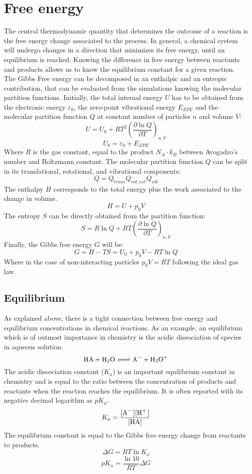 \section{Free energy}
The central thermodynamic quantity that determines the outcome of a reaction is the free energy change associated to the process. In general, a chemical system will undergo changes in a direction that minimizes its free energy, until an equilibrium is reached. Knowing the difference in free energy between reactants and products allows us to know the equilibrium constant for a given reaction. The Gibbs Free energy can be decomposed in an enthalpic and an entropic contribution, that can be evaluated from the simulations knowing the molecular partition functions. Initially, the total internal energy $U$ has to be obtained from the electronic energy $\varepsilon_0$, the zero-point vibrational energy $E_{ZPE}$ and the molecular partition function $Q$ at constant number of particles $n$ and volume $V$:
\[
U = U_{0} + R T^{2}\left(\frac{\partial \ln Q}{\partial T}\right)_{n,V}
\]
\[ U_{0} = \varepsilon_{0} + E_{ZPE} \]
Where $R$ is the gas constant, equal to the product $N_{A}\cdot k_{B}$ between Avogadro's number and Boltzmann constant. The molecular partition function $Q$ can be split in its translational, rotational, and vibrational components:
\[
Q = Q_{trans}Q_{rot, ext}Q_{vib}
\]
The enthalpy $H$ corresponds to the total energy plus the work associated to the change in volume.
\[
H = U + p_{0}V
\] 
The entropy $S$ can be directly obtained from the partition function:
\[
S = R \ln Q + RT \left(\frac{\partial \ln Q}{\partial
T}\right)_{n,V}
\]
Finally, the Gibbs free energy $G$ will be:
\[
G = H - TS = U_{0} + p_{0}V - RT\ln Q
\]
Where in the case of non-interacting particles $p_{0}V = RT$ following the ideal gas law. 

\subsection{Equilibrium}
As explained above, there is a tight connection between free energy and equilibrium concentrations in chemical reactions. As an example, an equilibrium which is of outmost importance in chemistry is the acidic dissociation of species in aqueous solution:
\[
\ce{HA + H2O <=> A- + H3O+}
\]
The acidic dissociation constant ($K_a$)  is an important equilibrium constant in chemistry and is equal to the ratio between the concentration of products and reactants when the reaction reaches the equilibrium. It is often reported with its negative decimal logarithm as $pK_a$.
\[
K_a=\dfrac{\ce{[A- ][H+ ]}}{\ce{[HA]}} 
\]
The equilibrium constant is equal to the Gibbs free energy change from reactants to products.
\[
\Delta G = RT \ln K_a
\]
\[
pK_a = \dfrac{\ln 10}{RT} \Delta G
\]


